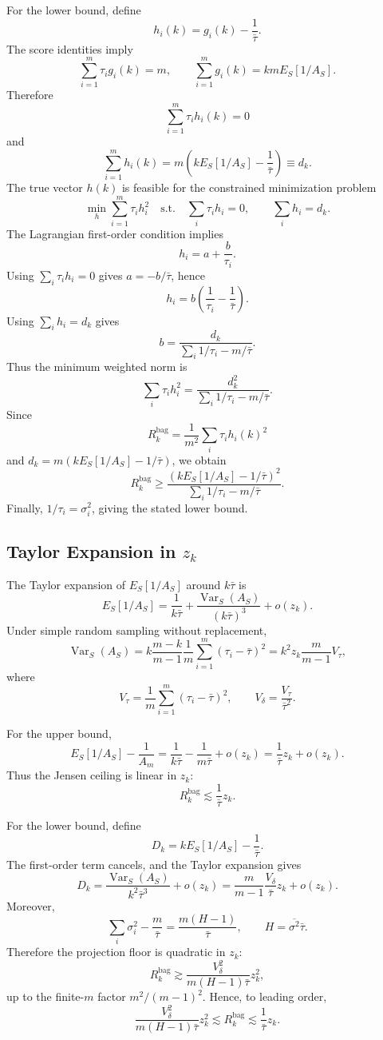 For the lower bound, define
\[
  h_i(k)=g_i(k)-\frac{1}{\bar\tau}.
\]
The score identities imply
\[
  \sum_{i=1}^m\tau_i g_i(k)=m,
  \qquad
  \sum_{i=1}^m g_i(k)=kmE_S[1/A_S].
\]
Therefore
\[
  \sum_{i=1}^m\tau_i h_i(k)=0
\]
and
\[
  \sum_{i=1}^m h_i(k)
  =
  m\left(kE_S[1/A_S]-\frac{1}{\bar\tau}\right)
  \equiv d_k.
\]
The true vector $h(k)$ is feasible for the constrained minimization problem
\[
  \min_h \sum_{i=1}^m\tau_i h_i^2
  \quad\text{s.t.}\quad
  \sum_i\tau_i h_i=0,\qquad
  \sum_i h_i=d_k.
\]
The Lagrangian first-order condition implies
\[
  h_i=a+\frac{b}{\tau_i}.
\]
Using $\sum_i\tau_i h_i=0$ gives $a=-b/\bar\tau$, hence
\[
  h_i=b\left(\frac{1}{\tau_i}-\frac{1}{\bar\tau}\right).
\]
Using $\sum_i h_i=d_k$ gives
\[
  b=
  \frac{d_k}{
    \sum_i1/\tau_i-m/\bar\tau
  }.
\]
Thus the minimum weighted norm is
\[
  \sum_i\tau_i h_i^2
  =
  \frac{d_k^2}{
    \sum_i1/\tau_i-m/\bar\tau
  }.
\]
Since
\[
  R_k^{\mathrm{bag}}
  =
  \frac{1}{m^2}\sum_i\tau_i h_i(k)^2
\]
and $d_k=m(kE_S[1/A_S]-1/\bar\tau)$, we obtain
\[
  R_k^{\mathrm{bag}}
  \ge
  \frac{
    \left(kE_S[1/A_S]-1/\bar\tau\right)^2
  }{
    \sum_i1/\tau_i-m/\bar\tau
  }.
\]
Finally, $1/\tau_i=\sigma_i^2$, giving the stated lower bound.

\subsection{Taylor Expansion in $z_k$}
\label{app:zk_expansion}

The Taylor expansion of $E_S[1/A_S]$ around $k\bar\tau$ is
\[
  E_S[1/A_S]
  =
  \frac{1}{k\bar\tau}
  +
  \frac{\operatorname{Var}_S(A_S)}{(k\bar\tau)^3}
  +
  o(z_k).
\]
Under simple random sampling without replacement,
\[
  \operatorname{Var}_S(A_S)
  =
  k\frac{m-k}{m-1}
  \frac{1}{m}\sum_{i=1}^m(\tau_i-\bar\tau)^2
  =
  k^2z_k\frac{m}{m-1}V_\tau,
\]
where
\[
  V_\tau=\frac{1}{m}\sum_{i=1}^m(\tau_i-\bar\tau)^2,
  \qquad
  V_\delta=\frac{V_\tau}{\bar\tau^2}.
\]

For the upper bound,
\[
  E_S[1/A_S]-\frac{1}{A_m}
  =
  \frac{1}{k\bar\tau}-\frac{1}{m\bar\tau}
  +o(z_k)
  =
  \frac{1}{\bar\tau}z_k+o(z_k).
\]
Thus the Jensen ceiling is linear in $z_k$:
\[
  R_k^{\mathrm{bag}}\lesssim \frac{1}{\bar\tau}z_k.
\]

For the lower bound, define
\[
  D_k=kE_S[1/A_S]-\frac{1}{\bar\tau}.
\]
The first-order term cancels, and the Taylor expansion gives
\[
  D_k
  =
  \frac{\operatorname{Var}_S(A_S)}{k^2\bar\tau^3}
  +o(z_k)
  =
  \frac{m}{m-1}\frac{V_\delta}{\bar\tau}z_k
  +o(z_k).
\]
Moreover,
\[
  \sum_i\sigma_i^2-\frac{m}{\bar\tau}
  =
  \frac{m(H-1)}{\bar\tau},
  \qquad
  H=\overline{\sigma^2}\bar\tau.
\]
Therefore the projection floor is quadratic in $z_k$:
\[
  R_k^{\mathrm{bag}}
  \gtrsim
  \frac{V_\delta^2}{m(H-1)\bar\tau}z_k^2,
\]
up to the finite-$m$ factor $m^2/(m-1)^2$.  Hence, to leading order,
\[
  \frac{V_\delta^2}{m(H-1)\bar\tau}z_k^2
  \lesssim
  R_k^{\mathrm{bag}}
  \lesssim
  \frac{1}{\bar\tau}z_k.
\]

